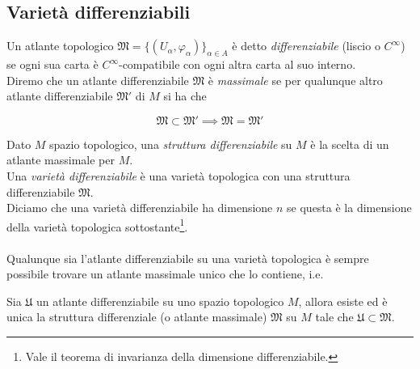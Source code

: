 \subsection{Varietà differenziabili}

Un atlante topologico $ \mathfrak{M} = \{(U_{\alpha},\varphi_{\alpha})\}_{\alpha \in A} $ è detto \textit{differenziabile} (liscio o $ C^{\infty} $) se ogni sua carta è $ C^{\infty} $-compatibile con ogni altra carta al suo interno. \\
Diremo che un atlante differenziabile $ \mathfrak{M} $ è \textit{massimale} se per qualunque altro atlante differenziabile $ \mathfrak{M}' $ di $ M $ si ha che

\begin{equation}
	\mathfrak{M} \subset \mathfrak{M}' \implies \mathfrak{M} = \mathfrak{M}'
\end{equation}

Dato $ M $ spazio topologico, una \textit{struttura differenziabile} su $ M $ è la scelta di un atlante massimale per $ M $. \\
Una \textit{varietà differenziabile} è una varietà topologica con una struttura differenziabile $ \mathfrak{M} $. \\
Diciamo che una varietà differenziabile ha dimensione $ n $ se questa è la dimensione della varietà topologica sottostante\footnote{%
	Vale il teorema di invarianza della dimensione differenziabile.%
}. \\ \\
%
Qualunque sia l'atlante differenziabile su una varietà topologica è sempre possibile trovare un atlante massimale unico che lo contiene, i.e.

\begin{definition}
	Sia $ \mathfrak{U} $ un atlante differenziabile su uno spazio topologico $ M $, allora esiste ed è unica la struttura differenziale (o atlante massimale) $ \mathfrak{M} $ su $ M $ tale che $ \mathfrak{U} \subset \mathfrak{M} $.
\end{definition}


